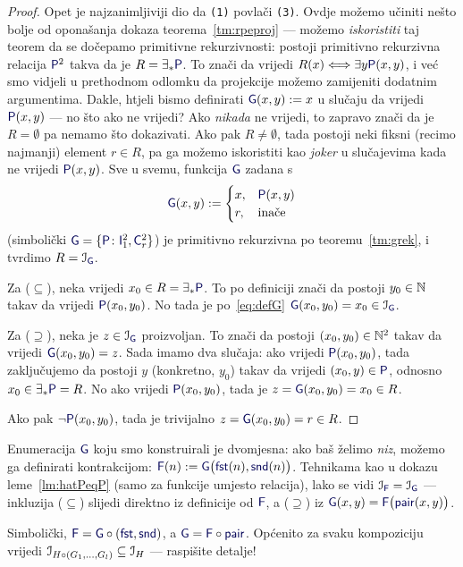 \begin{proof}
Opet je najzanimljiviji dio da \texttt{(1)} povlači \texttt{(3)}. %
Ovdje možemo učiniti nešto bolje od oponašanja dokaza teorema~\ref{tm:rpeproj} --- možemo \emph{iskoristiti} taj teorem da se dočepamo primitivne rekurzivnosti: postoji primitivno rekurzivna relacija $\f P^2$ takva da je $R=\exists_*\f P$. To znači da vrijedi $R(x)\Longleftrightarrow\exists y\f P(x,y)$, i već smo vidjeli u prethodnom odlomku da projekcije možemo zamijeniti dodatnim argumentima. Dakle, htjeli bismo definirati $\f G(x,y):=x$ u slučaju da vrijedi $\f P(x,y)$ --- no što ako ne vrijedi? Ako \emph{nikada} ne vrijedi, to zapravo znači da je $R=\emptyset$ pa nemamo što dokazivati. Ako pak $R\ne\emptyset$, tada postoji neki fiksni (recimo najmanji) element $r\in R$, pa ga možemo iskoristiti kao \emph{joker} u slučajevima kada ne vrijedi $\f P(x,y)$. Sve u svemu, funkcija $\f G$ zadana s
\begin{equation}\label{eq:defG}
    \f G(x,y):=\begin{cases}
        x,&\f P(x,y)\\
        r,&\text{inače}
    \end{cases}
\end{equation}
(simbolički $\f G=\{\f P\colon\f I_1^2,\f C_r^2\}$) je primitivno rekurzivna po teoremu~\ref{tm:grek}, i tvrdimo $R=\im{\f G}$.

Za ($\subseteq$), neka vrijedi $x_0\in R=\exists_*\f P$. To po definiciji znači da postoji $y_0\in{\mathbb N}$ takav da vrijedi $\f P(x_0,y_0)$. No tada je po~\eqref{eq:defG} $\f G(x_0,y_0)=x_0\in\im{\f G}$.

Za ($\supseteq$), neka je $z\in\im{\f G}$ proizvoljan. To znači da postoji $(x_0,y_0)\in{\mathbb N}^2$ takav da vrijedi $\f G(x_0,y_0)=z$. Sada imamo dva slučaja: ako vrijedi $\f P(x_0,y_0)$, tada zaključujemo da postoji $y$ (konkretno, $y_0$) takav da vrijedi $(x_0,y)\in\f P$, odnosno $x_0\in\exists_*\f P=R$. No ako vrijedi $\f P(x_0,y_0)$, tada je $z=\f G(x_0,y_0)=x_0\in R$.

Ako pak $\lnot\f P(x_0,y_0)$, tada je trivijalno $z=\f G(x_0,y_0)=r\in R$.
\end{proof}

\begin{napomena}[{name=[enumeracija kao jednomjesna funkcija --- niz]}]
Enumeracija $\f G$ koju smo konstruirali je dvomjesna: ako baš želimo \emph{niz}, možemo ga definirati kontrakcijom: $\f F(n):=\f G\bigl(\f{fst}(n),\f{snd}(n)\bigr)$. Tehnikama kao u dokazu leme~\ref{lm:hatPeqP} (samo za funkcije umjesto relacija), lako se vidi $\im{\f F}=\im{\f G}$ --- inkluzija ($\subseteq$) slijedi direktno iz definicije od $\f F$, a ($\supseteq$) iz $\f G(x,y)=\f F\bigl(\f{pair}(x,y)\bigr)$.

Simbolički, $\f F=\f G\circ(\f{fst},\f{snd})$, a $\f G=\f F\circ\f{pair}$. Općenito za svaku kompoziciju vrijedi $\mathcal I_{H\circ(G_1,\dotsc,G_l)}\subseteq\mathcal I_{H}$ --- raspišite detalje!
\end{napomena}

